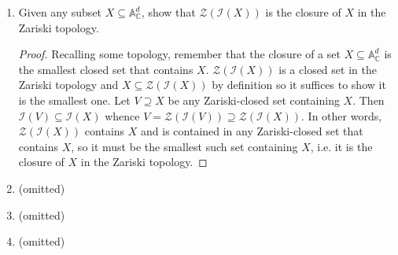 \documentclass[11pt,oneside,english]{amsart}
\theoremstyle{definition}
\newcommand{\MC}[1]{\mathcal{#1}}
\newcommand{\MB}[1]{\mathbb{#1}}
\begin{document}
\begin{enumerate}[leftmargin=*]
\item Given any subset $X \subseteq \mathbb{A}^d_{\mathbb{C}}$, show that $\mathcal{Z}(\mathcal{I}(X))$ is the closure of $X$ in the Zariski topology.
\begin{proof}
Recalling some topology, remember that the closure of a set $X\subseteq \MB{A}_\MB{C}^d$ is the smallest closed set that contains $X$. $\MC{Z}(\MC{I}(X))$ is a closed set in the Zariski topology and $X\subseteq \MC{Z}(\MC{I}(X))$ by definition so it suffices to show it is the smallest one. Let $V\supseteq X$ be any Zariski-closed set containing $X$. Then $\MC{I}(V)\subseteq \MC{I}(X)$ whence $V=\MC{Z}(\MC{I}(V))\supseteq \MC{Z}(\MC{I}(X))$. In other words, $\MC{Z}(\MC{I}(X))$ contains $X$ and is contained in any Zariski-closed set that contains $X$, so it must be the smallest such set containing $X$, i.e. it is the closure of $X$ in the Zariski topology.
\end{proof}

\item (omitted)
%

\item (omitted)

\item (omitted)





\end{enumerate}
\end{document}
